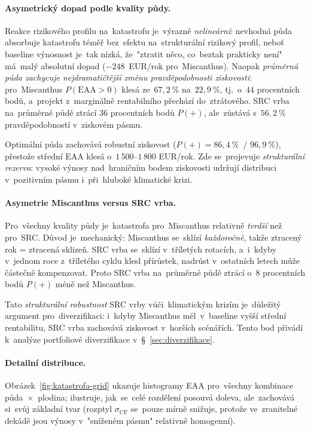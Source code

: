 \paragraph{Asymetrický dopad podle kvality půdy.}
Reakce rizikového profilu na~katastrofu je~výrazně \emph{nelineární}:
nevhodná půda absorbuje katastrofu téměř bez~efektu na~strukturální
rizikový profil, neboť baseline výnosnost je~tak nízká, že~"ztratit
něco, co~beztak prakticky není" má~malý absolutní dopad
($-248$~EUR/rok pro~Miscanthus). Naopak \emph{průměrná půda zachycuje
nejdramatičtější změnu pravděpodobnosti ziskovosti}: pro~Miscanthus
$P(\mathrm{EAA}>0)$ klesá ze~$67{,}2~\%$ na~$22{,}9~\%$, tj.~o~$44$
procentních bodů, a~projekt z~marginálně rentabilního přechází
do~ztrátového. SRC vrba na~průměrné půdě ztrácí $36$ procentních bodů
$P(+)$, ale~zůstává s~$56{,}2~\%$ pravděpodobností v~ziskovém pásmu.

Optimální půda zachovává robustní ziskovost ($P(+) = 86{,}4~\%$~/ $96{,}9~\%$),
přestože střední EAA klesá o~$1\,500$--$1\,800$ EUR/rok. Zde se~projevuje
\emph{strukturální rezerva}: vysoké výnosy nad~hraničním bodem
ziskovosti udržují distribuci v~pozitivním pásmu i~při~hluboké
klimatické krizi.

\paragraph{Asymetrie Miscanthus versus SRC vrba.}
Pro~všechny kvality půdy je~katastrofa pro~Miscanthus relativně
\emph{tvrdší} než pro~SRC. Důvod je~mechanický: Miscanthus se~sklízí
\emph{každoročně}, takže ztracený rok = ztracená sklizeň. SRC vrba se~sklízí
v~tříletých rotacích, a~i~kdyby v~jednom roce z~tříletého cyklu klesl
přírůstek, nadrůst v~ostatních letech může částečně kompenzovat. Proto
SRC vrba na~průměrné půdě ztrácí o~$8$ procentních bodů $P(+)$ méně
než Miscanthus.

Tato \emph{strukturální robustnost} SRC vrby vůči~klimatickým krizím
je~důležitý argument pro~diverzifikaci: i~kdyby Miscanthus měl~v~baseline
vyšší střední rentabilitu, SRC vrba zachovává ziskovost v~horších scénářích.
Tento bod přivádí k~analýze portfoliové diverzifikace
v~\S~\ref{sec:diverzifikace}.

\paragraph{Detailní distribuce.}
Obrázek~\ref{fig:katastrofa-grid} ukazuje histogramy EAA pro~všechny
kombinace půda~$\times$~plodina; ilustruje, jak~se~celé rozdělení posouvá
doleva, ale~zachovává si~svůj základní tvar (rozptyl $\sigma_\mathrm{CF}$
se~pouze mírně snižuje, protože ve~zranitelné dekádě jsou výnosy
v~"sníženém pásmu" relativně homogenní).


